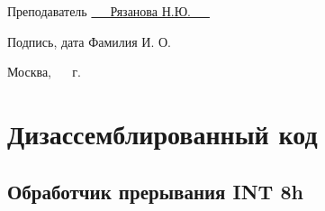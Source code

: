 \documentclass[a4paper,14pt]{article}
\begin{document}
\begin{titlepage}
	\vspace{0.5cm}
	
	\fontsize{12pt}{12pt}\selectfont
	\noindent\textnormal{Преподаватель} \hspace{50mm}
	\underline{\textnormal{\hphantom{~~~~~~~~~~~~~~~~~~~~~~~~~~~}}} \hspace{5mm}
	\noindent\underline{\textnormal{~~~Рязанова Н.Ю.~~~}}
	
	\vspace{2mm}
	
	\noindent\textnormal{\hphantom{Студент}} \hspace{28mm}\noindent
	\fontsize{8pt}{8pt}
	\textnormal{}\hspace{45mm}\textnormal{Подпись, дата} \hspace{22mm}\noindent\textnormal{Фамилия И. О.}
	
	\vspace{0.5cm}
	
	\fontsize{12pt}{12pt}\selectfont

	\begin{center}
		\vfill
		Москва, ~\the\year
		~г.
	\end{center}
	\clearpage
\end{titlepage}

\section{Дизассемблированный код}
\subsection{Обработчик прерывания INT 8h} 
\end{document}
